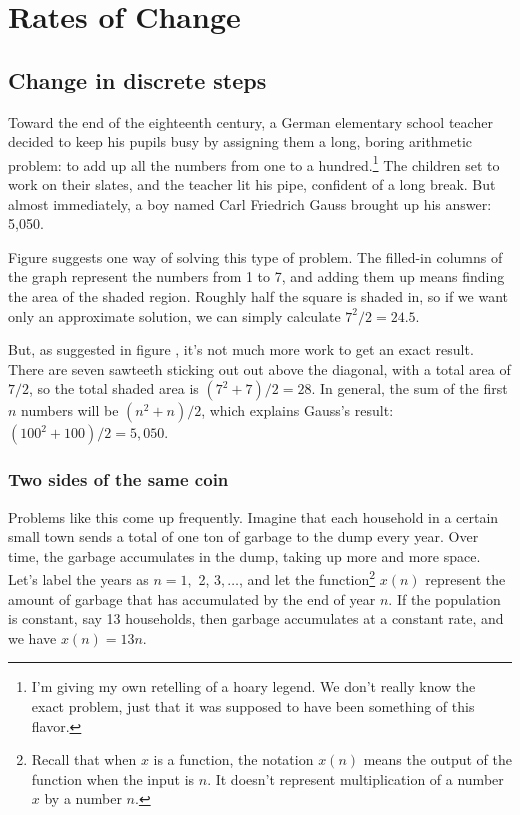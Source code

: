 \chapter{Rates of Change}\label{ch:rates-of-change}

\section{Change in discrete steps}

Toward the end of the eighteenth century, a German elementary school teacher
decided to keep his pupils busy by assigning them a long, boring arithmetic
problem: to add up all the numbers
from one to a hundred.\footnote{I'm giving my own retelling of a hoary legend. We don't really know the exact problem, just that it was
supposed to have been something of this flavor.}
 The children set to work on their slates, and the teacher
lit his pipe, confident of a long break. But almost immediately, a boy named
Carl Friedrich Gauss brought up his answer: 5,050.\label{gauss-story}
%
%

Figure  suggests one way of solving this type of problem.
The filled-in columns of the graph represent the numbers from 1 to 7, and
adding them up means finding the area of the shaded region. Roughly half the
square is shaded in, so if we want only an approximate solution, we can
simply calculate $7^2/2=24.5$.

But, as suggested in figure , it's not much more work to
get an exact result. There are seven sawteeth sticking out out above the diagonal,
with a total area of $7/2$, so the total shaded area is $(7^2+7)/2=28$.
In general, the sum of the first $n$ numbers will be $(n^2+n)/2$, which explains
Gauss's result: $(100^2+100)/2=5,050$.
%
%
\subsection{Two sides of the same coin}

Problems like this come up frequently. Imagine that each household in a certain
small town sends a total of one ton of garbage to the dump every year. Over
time, the garbage accumulates in the dump, taking up more and more space.
Let's label the years as $n=1,$ 2, $3,\ldots$, and let the
function\footnote{Recall that when $x$ is a function, the notation $x(n)$ means
the output of the function when the input is $n$. It doesn't represent
multiplication of a number $x$ by a number $n$.}
$x(n)$ represent the amount of garbage that has accumulated by the end
of year $n$.
If the population is constant, say 13 households, then
garbage accumulates at a constant rate, and we have $x(n)=13n$. 

